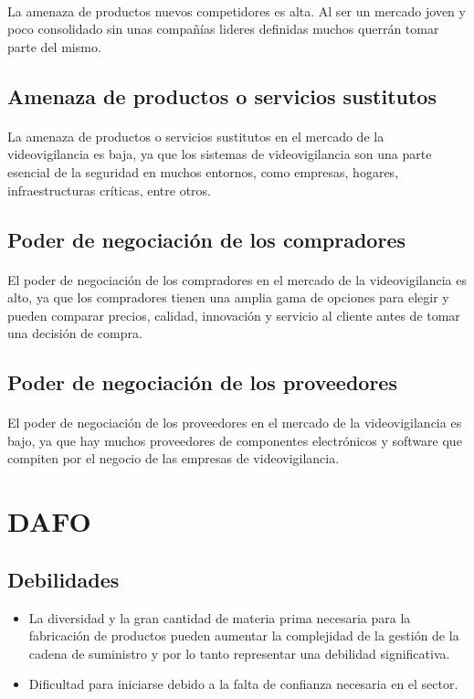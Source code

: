 \documentclass{report}
\begin{document}
          \paragraph*{}{La amenaza de productos nuevos competidores es alta. Al ser un mercado joven y poco consolidado sin unas compañías lideres definidas muchos querrán tomar parte del mismo.}
        \subsection*{Amenaza de productos o servicios sustitutos}
          \paragraph*{}{La amenaza de productos o servicios sustitutos en el mercado de la videovigilancia es baja, ya que los sistemas de videovigilancia son una parte esencial de la seguridad en muchos entornos, como empresas, hogares, infraestructuras críticas, entre otros.}
        \subsection*{Poder de negociación de los compradores}
          \paragraph*{}{El poder de negociación de los compradores en el mercado de la videovigilancia es alto, ya que los compradores tienen una amplia gama de opciones para elegir y pueden comparar precios, calidad, innovación y servicio al cliente antes de tomar una decisión de compra.}
        \subsection*{Poder de negociación de los proveedores}
          \paragraph*{}{El poder de negociación de los proveedores en el mercado de la videovigilancia es bajo, ya que hay muchos proveedores de componentes electrónicos y software que compiten por el negocio de las empresas de videovigilancia.}
      \clearpage\section{DAFO}
        \subsection*{Debilidades}
            \begin{itemize}
                \item La diversidad y la gran cantidad de materia prima necesaria para la fabricación de productos pueden aumentar la complejidad de la gestión de la cadena de suministro y por lo tanto representar una debilidad significativa.
                \item Dificultad para iniciarse debido a la falta de confianza necesaria en el sector.
            \end{itemize} 
\end{document}
